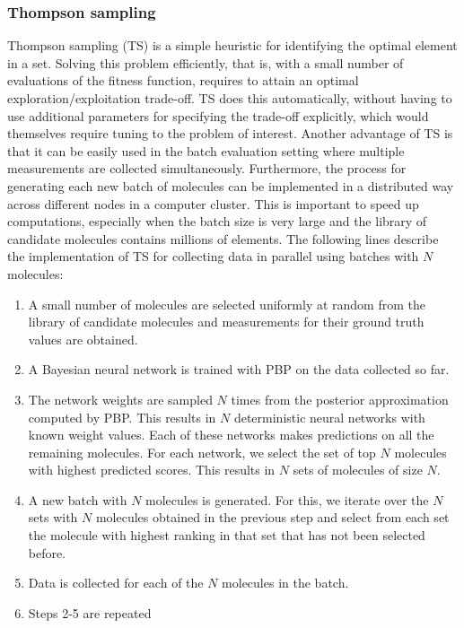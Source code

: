 \subsubsection{Thompson sampling}

Thompson sampling (TS) \cite{Thompson_1933} is a simple heuristic for identifying the optimal element in a set. Solving this problem efficiently, that is, with a small number of evaluations of the fitness function, requires to attain an optimal exploration/exploitation trade-off. TS does this automatically, without having to use additional parameters for specifying the trade-off explicitly, which would themselves require tuning to the problem of interest. Another advantage of TS is that it can be easily used
in the batch evaluation setting where multiple measurements are collected simultaneously. Furthermore, the process for generating each new batch of molecules can be implemented in a distributed way across different nodes in a computer cluster. This is important to speed up computations, especially when the batch size is very large and the library of candidate molecules contains millions of elements. The following lines describe the implementation of TS for collecting data in parallel using batches with $N$ molecules:
\begin{enumerate}
\item A small number of molecules are selected uniformly at random from the library of candidate molecules and measurements for their ground truth values are obtained.
\item A Bayesian neural network is trained with PBP on the data collected so far.
\item The network weights are sampled $N$ times from the posterior approximation computed by PBP. This results in $N$ deterministic neural networks with known weight values. Each of these networks makes predictions on all the remaining molecules. For each network, we select the set of top $N$ molecules with highest predicted scores. This results in $N$ sets of molecules of size $N$.
\item A new batch with $N$ molecules is generated. For this, we iterate over the $N$ sets with $N$ molecules obtained in the previous step and select from each set the molecule with highest ranking in that set that has not been selected before.
\item Data is collected for each of the $N$ molecules in the batch.
\item Steps 2-5 are repeated
\end{enumerate}

